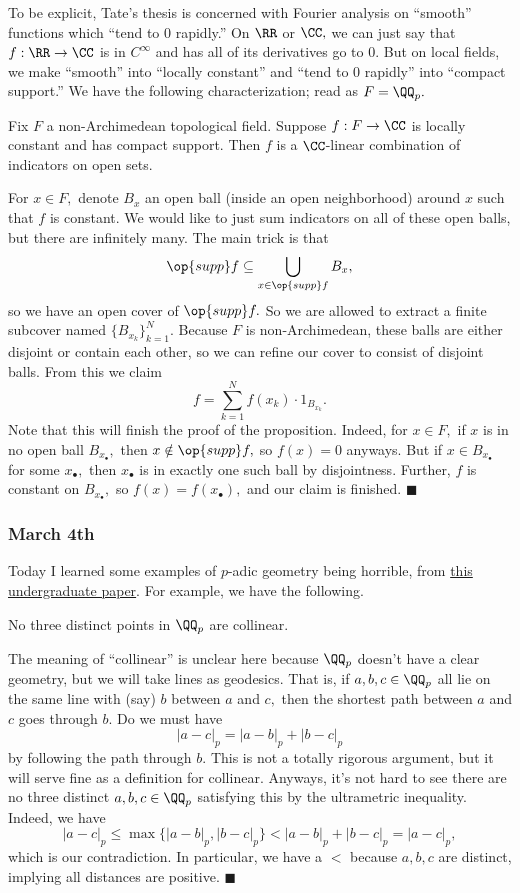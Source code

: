 To be explicit, Tate's thesis is concerned with Fourier analysis on ``smooth'' functions which ``tend to $0$ rapidly.'' On $\RR$ or $\CC,$ we can just say that $f:\RR\to\CC$ is in $C^\infty$ and has all of its derivatives go to $0.$ But on local fields, we make ``smooth'' into ``locally constant'' and ``tend to $0$ rapidly'' into ``compact support.'' We have the following characterization; read as $F=\QQ_p.$
\begin{proposition}
    Fix $F$ a non-Archimedean topological field. Suppose $f:F\to\CC$ is locally constant and has compact support. Then $f$ is a $\CC$-linear combination of indicators on open sets.
\end{proposition}
For $x\in F,$ denote $B_x$ an open ball (inside an open neighborhood) around $x$ such that $f$ is constant. We would like to just sum indicators on all of these open balls, but there are infinitely many. The main trick is that
\[\op{supp}f\subseteq\bigcup_{x\in\op{supp}f}B_x,\]
so we have an open cover of $\op{supp}f.$ So we are allowed to extract a finite subcover named $\{B_{x_k}\}_{k=1}^N.$ Because $F$ is non-Archimedean, these balls are either disjoint or contain each other, so we can refine our cover to consist of disjoint balls. From this we claim
\[f=\sum_{k=1}^Nf(x_k)\cdot1_{B_{x_k}}.\]
Note that this will finish the proof of the proposition. Indeed, for $x\in F,$ if $x$ is in no open ball $B_{x_\bullet},$ then $x\notin\op{supp}f,$ so $f(x)=0$ anyways. But if $x\in B_{x_\bullet}$ for some $x_\bullet,$ then $x_\bullet$ is in exactly one such ball by disjointness. Further, $f$ is constant on $B_{x_\bullet},$ so $f(x)=f(x_\bullet),$ and our claim is finished. $\blacksquare$

\subsubsection{March 4th}
Today I learned some examples of $p$-adic geometry being horrible, from \href{https://scholar.rose-hulman.edu/rhumj/vol8/iss1/2/}{this undergraduate paper}. For example, we have the following.
\begin{proposition}
    No three distinct points in $\QQ_p$ are collinear.
\end{proposition}
The meaning of ``collinear'' is unclear here because $\QQ_p$ doesn't have a clear geometry, but we will take lines as geodesics. That is, if $a,b,c\in\QQ_p$ all lie on the same line with (say) $b$ between $a$ and $c,$ then the shortest path between $a$ and $c$ goes through $b.$ Do we must have
\[|a-c|_p=|a-b|_p+|b-c|_p\]
by following the path through $b.$ This is not a totally rigorous argument, but it will serve fine as a definition for collinear. Anyways, it's not hard to see there are no three distinct $a,b,c\in\QQ_p$ satisfying this by the ultrametric inequality. Indeed, we have
\[|a-c|_p\le\max\{|a-b|_p,|b-c|_p\}<|a-b|_p+|b-c|_p=|a-c|_p,\]
which is our contradiction. In particular, we have a $<$ because $a,b,c$ are distinct, implying all distances are positive. $\blacksquare$

